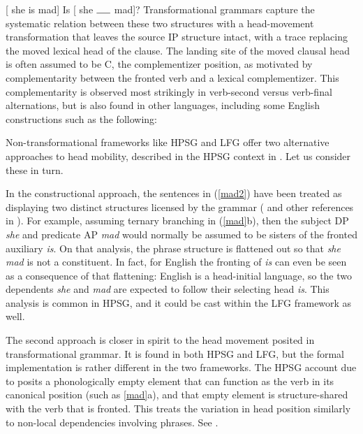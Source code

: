 \eal 
\label{mad}
\ex {} [ she is mad]
\ex  Is   [ she $\rule{0.5cm}{0.15mm}$ mad]?
\zl
Transformational grammars capture the systematic relation between these two structures with a head-movement transformation that leaves the source IP structure intact, with a trace replacing the moved lexical head of the clause.  The landing site of the moved clausal head is often assumed to be C, the complementizer position, as motivated by complementarity between the fronted verb and a lexical complementizer.  This complementarity is observed most strikingly in  verb-second versus verb-final alternations, but is also found in other languages, including some English constructions such as the following:  

\eal 
\label{mad2}
      \zl Non-transformational frameworks like HPSG and LFG offer two alternative approaches to head mobility, described in the HPSG context in .  Let us consider these in turn.

In the constructional approach,  
 the sentences in (\ref{mad2}) have been treated as displaying two distinct structures licensed by the grammar (\citealt{Sag2020a} and other references in ).  For example, assuming ternary branching in (\ref{mad}b), then the subject DP \textit{she} and predicate AP \textit{mad} would normally be assumed to be sisters of the fronted auxiliary \textit{is}.  On that analysis, the phrase structure is flattened out so that \textit{she mad} is not a constituent.  In fact, for English the fronting of \textit{is} can even be seen as a consequence of that flattening:  English is a head-initial language, so the two dependents \textit{she} and \textit{mad} are expected to follow their selecting head \textit{is}.  This analysis is common in HPSG, and it could be cast within the LFG framework as well.  

The second approach is closer in spirit to the head movement posited in transformational grammar.  It is found in both HPSG and LFG, but the formal implementation is rather different in the two frameworks.  The HPSG  account due to \citet{Borsley89} posits a phonologically empty element that can function as the verb in its canonical position (such as \ref{mad}a), and that empty element is structure-shared with the verb that is fronted.  This treats the variation in head position similarly to non-local dependencies involving phrases.  See .

